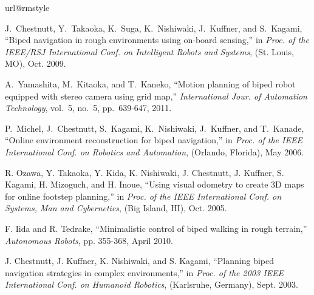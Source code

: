 \documentclass[10pt,conference]{ieeeconf}
\renewcommand{\baselinestretch}{1.0}
\begin{document}
\renewcommand{\baselinestretch}{0.97}
    \vspace*{-0.06in}
\begin{thebibliography}{10}
\providecommand{\url}[1]{#1}
\csname url@rmstyle\endcsname
\providecommand{\newblock}{\relax}
\providecommand{\bibinfo}[2]{#2}
\providecommand\BIBentrySTDinterwordspacing{\spaceskip=0pt\relax}
\providecommand\BIBentryALTinterwordstretchfactor{4}
\providecommand\BIBentryALTinterwordspacing{\spaceskip=\fontdimen2\font plus
\BIBentryALTinterwordstretchfactor\fontdimen3\font minus
  \fontdimen4\font\relax}
\providecommand\BIBforeignlanguage[2]{{%
\expandafter\ifx\csname l@#1\endcsname\relax
\typeout{** WARNING: IEEEtran.bst: No hyphenation pattern has been}%
\typeout{** loaded for the language `#1'. Using the pattern for}%
\typeout{** the default language instead.}%
\else
\language=\csname l@#1\endcsname
\fi
#2}}

J.~Chestnutt, Y.~Takaoka, K.~Suga, K.~Nishiwaki, J.~Kuffner, and S.~Kagami,
``Biped navigation in rough environments using on-board sensing,'' in
\emph{Proc. of the IEEE/RSJ International Conf. on Intelligent
Robots and Systems}, (St. Louis, MO), Oct. 2009.

A.~Yamashita, M.~Kitaoka, and T.~Kaneko, ``Motion planning of biped robot
equipped with stereo camera using grid map,'' \emph{International Jour. of
Automation Technology}, vol.~5, no.~5, pp.~639-647, 2011.

P.~Michel, J.~Chestnutt, S.~Kagami, K.~Nishiwaki, J.~Kuffner, and T.~Kanade,
``Online environment reconstruction for biped navigation,'' in
\emph{Proc. of the IEEE International Conf. on Robotics and
Automation}, (Orlando, Florida), May 2006.

R. Ozawa, Y. Takaoka, Y. Kida, K. Nishiwaki, J. Chestnutt, J. Kuffner, S.
Kagami, H. Mizoguch, and H. Inoue, ``Using visual odometry to create 3D maps
for online footstep planning,'' in \emph{Proc. of the IEEE International
Conf. on Systems, Man and Cybernetics}, (Big Island, HI), Oct. 2005.

F. Iida and R. Tedrake, ``Minimalistic control of biped walking in rough
terrain,'' \emph{Autonomous Robots}, pp. 355-368, April 2010.

J. Chestnutt, J. Kuffner, K. Nishiwaki, and S. Kagami, ``Planning biped
navigation strategies in complex environments,'' in \emph{Proc. of the
2003 IEEE International Conf. on Humanoid Robotics}, (Karlsruhe, Germany), Sept. 2003.


\end{thebibliography}
\end{document}
